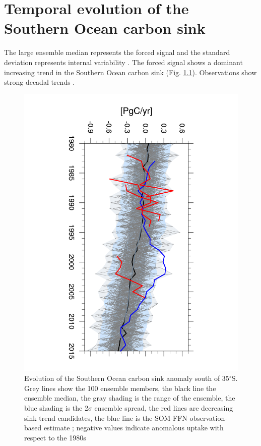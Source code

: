 \chapter{Temporal evolution of the Southern Ocean carbon sink}\label{ch:temporal} %

\citep{landschuetzer2015}

The large ensemble median represents the forced signal and the standard deviation represents internal variability \citep{Deser2012}. The forced signal shows a dominant increasing trend in the Southern Ocean carbon sink (Fig. \ref{fig:SOCS}). Observations show strong decadal trends \citep{landschuetzer2015}.

\begin{figure}[bth]
        \includegraphics[scale=0.43,trim=4cm 0cm 4cm 0cm,clip,angle=90]{gfx/co2flux_SO_timeseries_ym_mar-feb_35S_1980_2015_trend_8}
        \caption{Evolution of the Southern Ocean carbon sink anomaly south of 35$^\circ$S. Grey lines show the 100 ensemble members, the black line the ensemble median, the gray shading is the range of the ensemble, the blue shading is the 2$\sigma$ ensemble spread, the red lines are decreasing sink trend candidates, the blue line is the SOM-FFN observation-based estimate \citep{landschuetzer2015}; negative values indicate anomalous uptake with respect to the 1980s}
        \label{fig:SOCS}
\end{figure}
